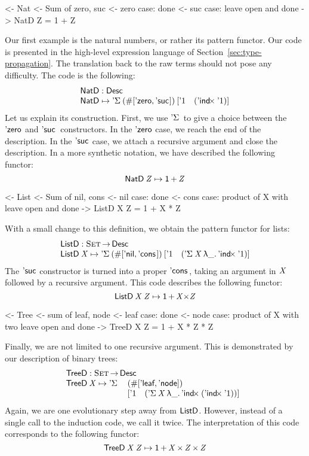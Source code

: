 \begin{wstructure}
<- Nat
    <- Sum of zero, suc
    <- zero case: done
    <- suc case: leave open and done
    -> NatD Z = 1 + Z
\end{wstructure}

Our first example is the natural numbers, or rather its pattern
functor. Our code is presented in the high-level expression language
of Section~\ref{sec:type-propagation}. The translation back to the raw
terms should not pose any difficulty. The code is the following:
%
\[\stk{
\NatD : \Desc \\
\NatD \mapsto \DSigma{(\EnumT{[ \NatZero, \NatSuc{\!} ]})}
                     {[ \DUnit \quad (\DIndx{\DUnit}) ]}
}\]
%
Let us explain its construction. First, we use $\DSigma{\!}{\!}$ to
give a choice between the $\NatZero$ and $\NatSuc{}$ constructors. In
the $\NatZero$ case, we reach the end of the description. In the
$\NatSuc{\!}$ case, we attach a recursive argument and close the
description. In a more synthetic notation, we have described the
following functor:
%
\[    \NatD\: \V{Z} \mapsto \Unit \mathop{\D{+}} \V{Z}    \]

\begin{wstructure}
<- List
    <- Sum of nil, cons
    <- nil case: done
    <- cons case: product of X with leave open and done
    -> ListD X Z = 1 + X * Z
\end{wstructure}

With a small change to this definition, we obtain the pattern functor
for lists:
%
\[\stk{
\ListD : \Set \To \Desc \\
\ListD \: \V{X} \mapsto \DSigma{(\EnumT{[ \ListNil, \ListCons{\!}{\!} ]})}
                           {[ \DUnit \quad (\DSigma{\V{X}}{\LAM{\_} \DIndx{\DUnit}}) ]}
}\]
%
The $\NatSuc{\!}$ constructor is turned into a proper
$\ListCons{\!}{\!}$, taking an argument in $\V{X}$ followed by a
recursive argument. This code describes the following functor:
%
\[    \ListD\: \V{X}\: \V{Z} \mapsto \Unit \mathop{\D{+}} \V{X} \D{\ensuremath{\times}} \V{Z}     \]

\begin{wstructure}
<- Tree
    <- sum of leaf, node
    <- leaf case: done
    <- node case: product of X with two leave open and done
    -> TreeD X Z = 1 + X * Z * Z
\end{wstructure}

Finally, we are not limited to one recursive argument. This is
demonstrated by our description of binary trees:
%
\[\stk{
\TreeD : \Set \To \Desc \\
\begin{array}{@{}ll}
\TreeD \: \V{X} \mapsto \DSigma{ & (\EnumT{[ \TreeLeaf, \TreeNode ]}) \\}
                           { & [ \DUnit \quad (\DSigma{\V{X}}{\LAM{\_} \DIndx{(\DIndx{\DUnit})}}) ]}
\end{array}
}\]
%
Again, we are one evolutionary step away from $\ListD$. However,
instead of a single call to the induction code, we call it twice. The
interpretation of this code corresponds to the following functor:
%
\[    \TreeD\: \V{X}\: \V{Z} \mapsto \Unit \mathop{\D{+}} \V{X} \Prod \V{Z} \Prod \V{Z}     \]


